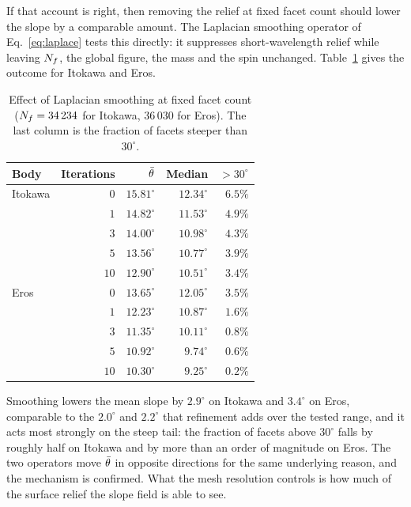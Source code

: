 If that account is right, then removing the relief at fixed facet count should
lower the slope by a comparable amount. The Laplacian smoothing operator of
Eq.~\eqref{eq:laplace} tests this directly: it suppresses short-wavelength
relief while leaving $N_{f}$, the global figure, the mass and the spin unchanged.
Table~\ref{tab:smooth} gives the outcome for Itokawa and Eros.

\begin{table}[t]
\centering
\small
\caption{Effect of Laplacian smoothing at fixed facet count
($N_{f} = 34\,234$ for Itokawa, $36\,030$ for Eros). The last column is the
fraction of facets steeper than $30^{\circ}$.}
\label{tab:smooth}
\begin{tabular}{lrrrr}
\toprule
Body & Iterations & $\bar{\theta}$ & Median & $>30^{\circ}$ \\
\midrule
Itokawa & $0$  & $15.81^{\circ}$ & $12.34^{\circ}$ & $6.5\%$ \\
        & $1$  & $14.82^{\circ}$ & $11.53^{\circ}$ & $4.9\%$ \\
        & $3$  & $14.00^{\circ}$ & $10.98^{\circ}$ & $4.3\%$ \\
        & $5$  & $13.56^{\circ}$ & $10.77^{\circ}$ & $3.9\%$ \\
        & $10$ & $12.90^{\circ}$ & $10.51^{\circ}$ & $3.4\%$ \\
\midrule
Eros    & $0$  & $13.65^{\circ}$ & $12.05^{\circ}$ & $3.5\%$ \\
        & $1$  & $12.23^{\circ}$ & $10.87^{\circ}$ & $1.6\%$ \\
        & $3$  & $11.35^{\circ}$ & $10.11^{\circ}$ & $0.8\%$ \\
        & $5$  & $10.92^{\circ}$ & $9.74^{\circ}$  & $0.6\%$ \\
        & $10$ & $10.30^{\circ}$ & $9.25^{\circ}$  & $0.2\%$ \\
\bottomrule
\end{tabular}
\end{table}

Smoothing lowers the mean slope by $2.9^{\circ}$ on Itokawa and $3.4^{\circ}$
on Eros, comparable to the $2.0^{\circ}$ and $2.2^{\circ}$ that refinement adds
over the tested range, and it acts most strongly on the steep tail: the fraction
of facets above $30^{\circ}$ falls by roughly half on Itokawa and by more than
an order of magnitude on Eros. The two operators move $\bar{\theta}$ in opposite
directions for the same underlying reason, and the mechanism is confirmed. What
the mesh resolution controls is how much of the surface relief the slope field
is able to see.

